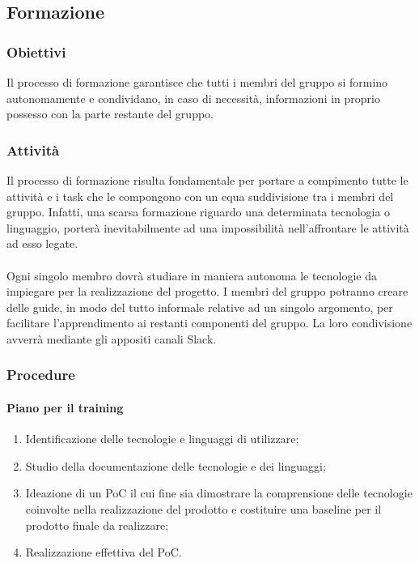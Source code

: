    	\subsection{Formazione}
	\subsubsection{Obiettivi}
	Il processo di formazione garantisce che tutti i membri del gruppo si formino autonomamente e condividano, in caso di necessità, informazioni in proprio possesso con la parte restante del gruppo. 
	
	\subsubsection{Attività}
	Il processo di formazione risulta fondamentale per portare a compimento tutte le attività e i task che le compongono con un equa suddivisione tra i membri del gruppo. Infatti, una scarsa formazione riguardo una determinata tecnologia o linguaggio, porterà inevitabilmente ad una impossibilità nell'affrontare le attività ad esso legate.\\\\
	Ogni singolo membro dovrà studiare in maniera autonoma le tecnologie da impiegare per la realizzazione del progetto. I membri del gruppo potranno creare delle guide, in modo del tutto informale relative ad un singolo argomento, per facilitare l'apprendimento ai restanti componenti del gruppo. La loro condivisione avverrà mediante gli appositi canali Slack.
	
	\subsubsection{Procedure}
	\paragraph{Piano per il training}
	\begin{enumerate}
		\item Identificazione delle tecnologie e linguaggi di utilizzare;
		\item Studio della documentazione delle tecnologie e dei linguaggi;
		\item Ideazione di un PoC il cui fine sia dimostrare la comprensione delle tecnologie coinvolte nella realizzazione del prodotto e costituire una baseline per il prodotto finale da realizzare;
		\item Realizzazione effettiva del PoC.   		
	\end{enumerate}
	
